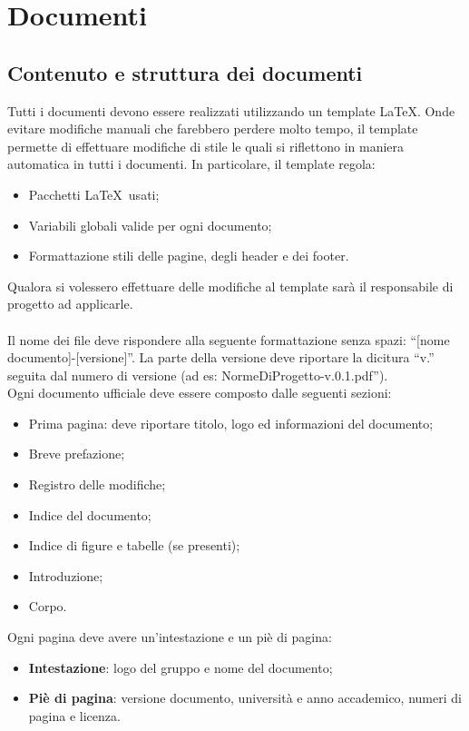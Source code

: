 \section{Documenti}{
	\label{sec:docs}
	\subsection{Contenuto e struttura dei documenti}{
		\label{sub:content}
		Tutti i documenti devono essere realizzati utilizzando un template \LaTeX. Onde evitare modifiche manuali che farebbero perdere molto tempo, il template permette di effettuare modifiche di stile le quali si riflettono in maniera automatica in tutti i documenti. In particolare, il template regola:
		\begin{itemize}
			\item Pacchetti \LaTeX\ usati;
			\item Variabili globali valide per ogni documento;
			\item Formattazione stili delle pagine, degli header e dei footer.
		\end{itemize}
		Qualora si volessero effettuare delle modifiche al template sar\`{a} il responsabile di progetto ad applicarle.\\
		\\
		Il nome dei file deve rispondere alla seguente formattazione senza spazi: “[nome documento]-[versione]”. La parte della versione deve riportare la dicitura “v.” seguita dal numero di versione (ad es: NormeDiProgetto-v.0.1.pdf”).\\
		Ogni documento ufficiale deve essere composto dalle seguenti sezioni:
		\begin{itemize}
			\item Prima pagina: deve riportare titolo, logo ed informazioni del documento;
			\item Breve prefazione;
			\item Registro delle modifiche;
			\item Indice del documento;
			\item Indice di figure e tabelle (se presenti);
			\item Introduzione;
			\item Corpo.
		\end{itemize}
		Ogni pagina deve avere un'intestazione e un pi\`{e} di pagina:
		\begin{itemize}
			\item \textbf{Intestazione}: logo del gruppo e nome del documento;
			\item \textbf{Pi\`{e} di pagina}: versione documento, universit\`{a} e anno accademico, numeri di pagina e licenza.

\end{itemize}}}
